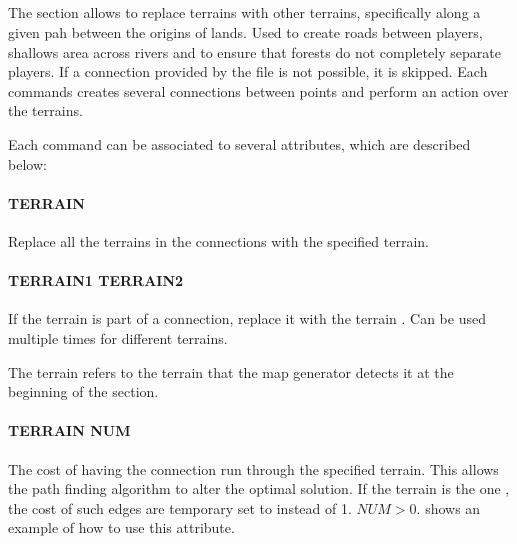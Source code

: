 \begin{appendices}
    \subsection{}

    The section allows to replace terrains with other terrains, specifically along a given pah between the origins of lands. Used to create roads between players, shallows area across rivers and to ensure that forests do not completely separate players. If a connection provided by the  file is not possible, it is skipped.  Each commands creates several connections between points and perform an action over the terrains.

    Each command can be associated to several attributes, which are described below:

    \paragraph{ TERRAIN}

    Replace all the terrains in the connections with the specified terrain.

    \paragraph{ TERRAIN1 TERRAIN2}

    If the terrain  is part of a connection, replace it with the terrain . Can be used multiple times for different terrains.

    \begin{attention}
        The terrain  refers to the terrain that the map generator detects it at the beginning of the  section.
    \end{attention}

    \paragraph{ TERRAIN NUM}

    The cost of having the connection run through the specified terrain. This allows the path finding algorithm \cite{dijkstra1959a} to alter the optimal solution. If the terrain is the one , the cost of such edges are temporary set to  instead of 1. $NUM > 0$.  shows an example of how to use this attribute.


\end{appendices}
